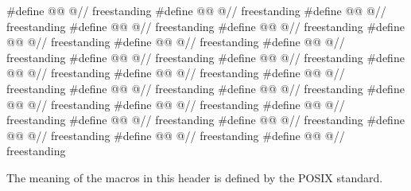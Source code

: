 \begin{codeblock}
#define @@ @\seebelow@                                              // freestanding
#define @@ @\seebelow@                                            // freestanding
#define @@ @\seebelow@                                      // freestanding
#define @@ @\seebelow@                                             // freestanding
#define @@ @\seebelow@                                              // freestanding
#define @@ @\seebelow@                                               // freestanding
#define @@ @\seebelow@                                                // freestanding
#define @@ @\seebelow@                                           // freestanding
#define @@ @\seebelow@                                            // freestanding
#define @@ @\seebelow@                                           // freestanding
#define @@ @\seebelow@                                                // freestanding
#define @@ @\seebelow@                                                // freestanding
#define @@ @\seebelow@                                               // freestanding
#define @@ @\seebelow@                                      // freestanding
#define @@ @\seebelow@                                           // freestanding
#define @@ @\seebelow@                                               // freestanding
#define @@ @\seebelow@                                                // freestanding
#define @@ @\seebelow@                                               // freestanding
#define @@ @\seebelow@                                                // freestanding
#define @@ @\seebelow@                                            // freestanding
#define @@ @\seebelow@                                              // freestanding
#define @@ @\seebelow@                                          // freestanding
#define @@ @\seebelow@                                                // freestanding
\end{codeblock}

\pnum
The meaning of the macros in this header is defined by the POSIX standard.


